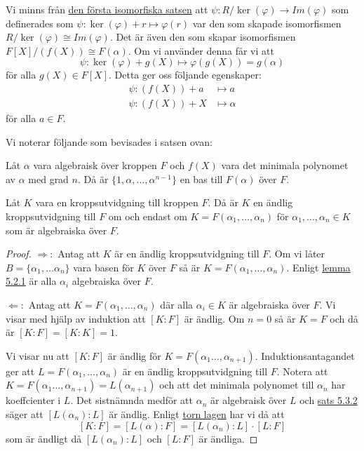 \documentclass{article}
\theoremstyle{definition}
\begin{document}
Vi minns från \hyperlink{isomorfiska}{den första isomorfiska satsen} att $\psi:R/\ker(\varphi) \rightarrow Im(\varphi)$ som definerades som 
$\psi: \ker(\varphi) + r \mapsto \varphi(r)$ var den som skapade isomorfismen $R/\ker(\varphi) \cong Im(\varphi)$. Det är även 
den som skapar isomorfismen $F[X]/(f(X)) \cong F(\alpha)$. Om vi använder denna får vi att
\[\psi: \ker(\varphi) + g(X) \mapsto \varphi(g(X)) = g(\alpha)\]
för alla $g(X) \in F[X]$. Detta ger oss följande egenskaper: 
\begin{align*}
  \psi: (f(X)) + a &\mapsto a \\
  \psi: (f(X)) + X &\mapsto \alpha
\end{align*}
för alla $a \in F.$

Vi noterar följande som bevisades i satsen ovan: 
\hypertarget{kol5.3.1}{}
\begin{mykol}{}{}
  Låt $\alpha$ vara algebraisk över kroppen $F$ och $f(X)$ vara det minimala polynomet av $\alpha$ med grad $n$. 
  Då är $\{1, \alpha, \ldots, \alpha^{n-1}\}$ en bas till $F(\alpha)$ över $F$. 
\end{mykol}

\hypertarget{sats5.3.3}{}
\begin{mytheo}{}{}
  Låt $K$ vara en kroppsutvidgning till kroppen $F$. Då är $K$ en ändlig kroppsutvidgning till $F$ om och endast om $K = F(\alpha_1, \ldots, \alpha_n)$
  för $\alpha_1, \ldots, \alpha_n \in K$ som är algebraiska över $F$.
\end{mytheo}

\begin{proof}
  $\Rightarrow:$ Antag att $K$ är en ändlig kroppsutvidgning till $F$. Om vi låter
  $B = \{\alpha_1, \ldots \alpha_n\}$ vara basen för $K$ över $F$ så är $K = F(\alpha_1, \ldots, \alpha_n)$. Enligt 
  \hyperlink{algebraiskkropp}{lemma 5.2.1} är alla $\alpha_i$ algebraiska över $F$.

  $\Leftarrow:$ Antag att $K = F(\alpha_1, \ldots, \alpha_n)$ där alla $\alpha_i \in K$ är algebraiska över $F$. Vi visar med hjälp av induktion att 
  $[K:F]$ är ändlig. Om $n = 0$ så är $K = F$ och då är $[K:F] = [K:K] = 1$.

  Vi visar nu att $[K:F]$ är ändlig för $K = F(\alpha_1 \ldots, \alpha_{n+1})$. Induktionsantagandet ger att $L = F(\alpha_1, \ldots, \alpha_n)$ 
  är en ändlig kroppsutvidgning till $F$. Notera att $K = F(\alpha_1 \ldots, \alpha_{n+1}) = L(\alpha_{n+1})$ och att det minimala polynomet till $\alpha_n$
  har koeffcienter i $L$. Det sistnämnda medför att $\alpha_n$ är algebraisk över $L$ och \hyperlink{5.3.2}{sats 5.3.2} säger att $[L(\alpha_n):L]$
  är ändlig. Enligt \hyperlink{torn lagen}{torn lagen} har vi då att 
  \[ [K:F] = [L(\alpha):F] = [L(\alpha_n): L] \cdot [L : F]\]
  som är ändligt då $[L(\alpha_n): L]$ och $[L : F]$ är ändliga. 
\end{proof}
\end{document}
